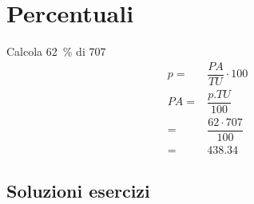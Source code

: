 \chapter{Percentuali}
\tcbstartrecording
\begin{exercise}
Calcola \SI{62}{\percent} di \num{707}
	\tcblower
\begin{align*}
	p=&\dfrac{PA}{TU}\cdot 100\\
	PA=&\dfrac{p. TU}{100}\\
=&\dfrac{62\cdot 707}{100}\\
=&\num{438.34}
\end{align*}
\end{exercise}
\tcbstoprecording
\newpage
\section{Soluzioni esercizi}
\tcbinputrecords